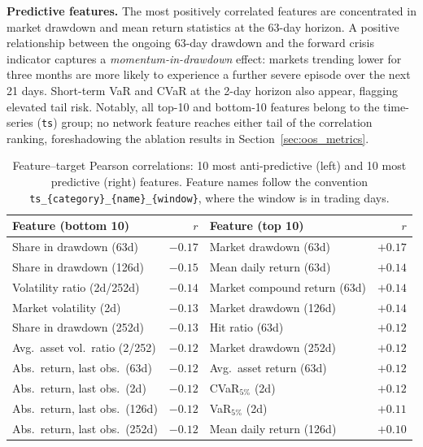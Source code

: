 \documentclass{article}
\begin{document}
\textbf{Predictive features.} The most positively correlated features are concentrated in market drawdown and mean return statistics at the 63-day horizon. A positive relationship between the ongoing 63-day drawdown and the forward crisis indicator captures a \emph{momentum-in-drawdown} effect: markets trending lower for three months are more likely to experience a further severe episode over the next 21 days. Short-term VaR and CVaR at the 2-day horizon also appear, flagging elevated tail risk. Notably, all top-10 and bottom-10 features belong to the time-series (\texttt{ts}) group; no network feature reaches either tail of the correlation ranking, foreshadowing the ablation results in Section~\ref{sec:oos_metrics}.

\begin{table}[H]
\centering
\small
\caption{Feature--target Pearson correlations: 10 most anti-predictive (left) and 10 most predictive (right) features. Feature names follow the convention \texttt{ts\_\{category\}\_\{name\}\_\{window\}}, where the window is in trading days.}
\label{tab:feat_corr}
\begin{tabular}{p{5.2cm}rp{5.2cm}r}
\toprule
\textbf{Feature (bottom 10)} & \textbf{$r$} & \textbf{Feature (top 10)} & \textbf{$r$} \\
\midrule
Share in drawdown (63d)         & $-0.17$ & Market drawdown (63d)         & $+0.17$ \\
Share in drawdown (126d)        & $-0.15$ & Mean daily return (63d)        & $+0.14$ \\
Volatility ratio (2d/252d)      & $-0.14$ & Market compound return (63d)   & $+0.14$ \\
Market volatility (2d)          & $-0.13$ & Market drawdown (126d)         & $+0.14$ \\
Share in drawdown (252d)        & $-0.13$ & Hit ratio (63d)                & $+0.12$ \\
Avg.\ asset vol.\ ratio (2/252) & $-0.12$ & Market drawdown (252d)         & $+0.12$ \\
Abs.\ return, last obs.\ (63d)  & $-0.12$ & Avg.\ asset return (63d)       & $+0.12$ \\
Abs.\ return, last obs.\ (2d)   & $-0.12$ & CVaR$_{5\%}$ (2d)             & $+0.12$ \\
Abs.\ return, last obs.\ (126d) & $-0.12$ & VaR$_{5\%}$ (2d)              & $+0.11$ \\
Abs.\ return, last obs.\ (252d) & $-0.12$ & Mean daily return (126d)       & $+0.10$ \\
\bottomrule
\end{tabular}
\end{table}
\end{document}
